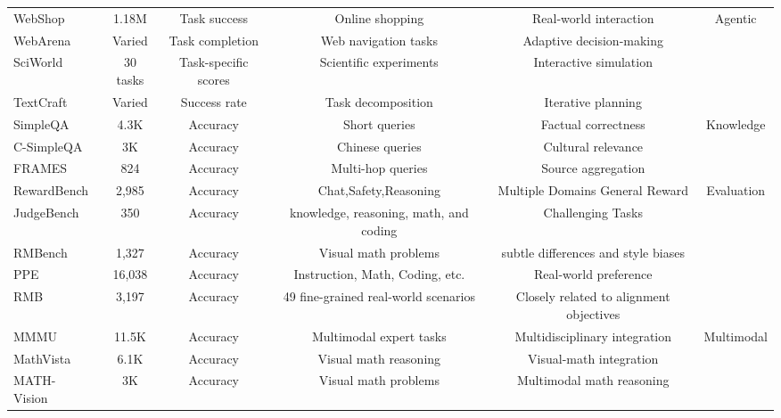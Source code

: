 \begin{table*}[!ht]
\begin{adjustbox}{width=\textwidth,keepaspectratio}
\begin{tabular}{lccccc}
WebShop~\citep{yao2023webshop} & 1.18M & Task success & Online shopping & Real-world interaction & \multirow{4}{*}{Agentic} \\
WebArena~\citep{zhou2023webarena} & Varied & Task completion & Web navigation tasks & Adaptive decision-making &  \\
SciWorld~\citep{wang2022sciworld} & 30 tasks & Task-specific scores & Scientific experiments & Interactive simulation &  \\
TextCraft~\citep{prasad2024adaptasneededdecompositionplanning} & Varied & Success rate & Task decomposition & Iterative planning &  \\
\midrule
SimpleQA~\citep{wei2024measuringshortformfactualitylarge} & 4.3K & Accuracy & Short queries & Factual correctness & \multirow{3}{*}{Knowledge} \\
C-SimpleQA~\citep{he2024chinesesimpleqachinesefactuality} & 3K & Accuracy & Chinese queries & Cultural relevance &  \\
FRAMES~\citep{krishna2025factfetchreasonunified} & 824 & Accuracy & Multi-hop queries & Source aggregation &  \\
\midrule
RewardBench~\citep{lambert2024rewardbenchevaluatingrewardmodels} & 2,985 & Accuracy & Chat,Safety,Reasoning & Multiple Domains General Reward & \multirow{5}{*}{Evaluation} \\
JudgeBench~\citep{tan2025judgebenchbenchmarkevaluatingllmbased} & 350 & Accuracy & knowledge, reasoning, math, and coding & Challenging Tasks &  \\
RMBench~\citep{liu2024improvingmultistepreasoningabilities} & 1,327 & Accuracy & Visual math problems & subtle differences and style biases &  \\
PPE~\citep{frick2024evaluaterewardmodelsrlhf} & 16,038 & Accuracy & Instruction, Math, Coding, etc. & Real-world preference & \\ 
RMB~\citep{zhou2025rmbcomprehensivelybenchmarkingreward} & 3,197 & Accuracy & 49 fine-grained real-world scenarios & Closely related to alignment
objectives &  \\
\midrule
MMMU~\citep{yue2024mmmu} & 11.5K & Accuracy & Multimodal expert tasks & Multidisciplinary integration & \multirow{9}{*}{Multimodal} \\
MathVista~\citep{lu2024mathvista} & 6.1K & Accuracy & Visual math reasoning & Visual-math integration &  \\
MATH-Vision~\citep{wang2024measuring} & 3K & Accuracy & Visual math problems & Multimodal math reasoning &  \\

\end{tabular}
\end{adjustbox}
\end{table*}
